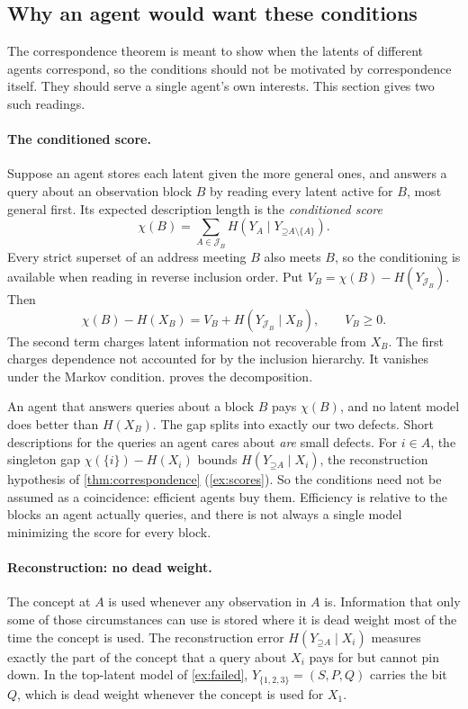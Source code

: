 \documentclass[11pt]{article}
\newcommand{\Up}{\mathord{\supseteq}}
\begin{document}
\subsection{Why an agent would want these conditions}
\label{sec:why}
The correspondence theorem is meant to show when the latents of different
agents correspond, so the conditions should not be motivated by correspondence
itself. They should serve a single agent's own interests. This section gives
two such readings.

\paragraph{The conditioned score.}
Suppose an agent stores each latent given the more general ones, and answers a
query about an observation block $B$ by reading every latent active for $B$,
most general first. Its expected description length is the \emph{conditioned
score}
\[
 \chi(B)=\sum_{A\in\mathcal{J}_B}H(Y_A\mid Y_{\Up A\setminus\{A\}}).
\]
Every strict superset of an address meeting $B$ also meets $B$, so the
conditioning is available when reading in reverse inclusion order. Put
$V_B=\chi(B)-H(Y_{\mathcal{J}_B})$. Then
\begin{equation}
 \chi(B)-H(X_B)=V_B+H(Y_{\mathcal{J}_B}\mid X_B),\qquad V_B\ge0.
 \label{eq:score}
\end{equation}
The second term charges latent information not recoverable from $X_B$.
The first charges dependence not accounted for by the inclusion hierarchy.
It vanishes under the Markov condition.  proves the
decomposition.

An agent that answers queries about a block $B$ pays $\chi(B)$, and no
latent model does better than $H(X_B)$. The gap splits into exactly our two
defects. Short descriptions for the queries an agent cares about \emph{are}
small defects. For $i\in A$, the singleton gap $\chi(\{i\})-H(X_i)$ bounds
$H(Y_{\Up A}\mid X_i)$, the reconstruction hypothesis of
\cref{thm:correspondence} (\cref{ex:scores}).
So the conditions need not be assumed as a coincidence: efficient agents buy
them. Efficiency is relative to the blocks an agent actually queries, and there is
not always a single model minimizing the score for every block.

\paragraph{Reconstruction: no dead weight.}
The concept at $A$ is used whenever any observation in $A$ is. Information
that only some of those circumstances can use is stored where it is dead
weight most of the time the concept is used. The reconstruction error
$H(Y_{\Up A}\mid X_i)$ measures exactly the part of the concept that a query
about $X_i$ pays for but cannot pin down. In the top-latent model of
\cref{ex:failed}, $Y_{\{1,2,3\}}=(S,P,Q)$ carries the bit $Q$, which is dead
weight whenever the concept is used for $X_1$.
\end{document}
